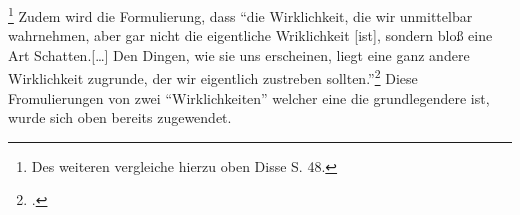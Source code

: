 \footnote{Des weiteren vergleiche hierzu oben Disse S. 48.}
Zudem wird die Formulierung, dass \enquote{die Wirklichkeit, die wir unmittelbar wahrnehmen, aber gar nicht die eigentliche Wriklichkeit [ist], sondern bloß eine Art Schatten.[\dots] Den Dingen, wie sie uns erscheinen, liegt eine ganz andere Wirklichkeit zugrunde, der wir eigentlich zustreben sollten.}\footcite[][S. 23]{DisseMetaphysik}
Diese Fromulierungen von zwei \enquote{Wirklichkeiten} welcher eine die grundlegendere ist, wurde sich oben bereits zugewendet.

